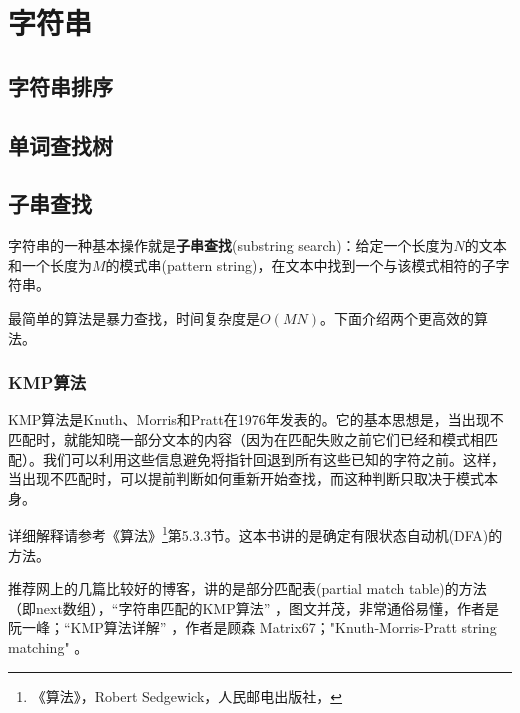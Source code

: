 \chapter{字符串}


\section{字符串排序} %


\section{单词查找树} %


\section{子串查找} %
字符串的一种基本操作就是\textbf{子串查找}(substring search)：给定一个长度为$N$的文本和一个长度为$M$的模式串(pattern string)，在文本中找到一个与该模式相符的子字符串。

最简单的算法是暴力查找，时间复杂度是$O(MN)$。下面介绍两个更高效的算法。


\subsection{KMP算法}
KMP算法是Knuth、Morris和Pratt在1976年发表的。它的基本思想是，当出现不匹配时，就能知晓一部分文本的内容（因为在匹配失败之前它们已经和模式相匹配）。我们可以利用这些信息避免将指针回退到所有这些已知的字符之前。这样，当出现不匹配时，可以提前判断如何重新开始查找，而这种判断只取决于模式本身。

详细解释请参考《算法》\footnote{《算法》，Robert Sedgewick，人民邮电出版社，}第5.3.3节。这本书讲的是确定有限状态自动机(DFA)的方法。

推荐网上的几篇比较好的博客，讲的是部分匹配表(partial match table)的方法（即next数组），“字符串匹配的KMP算法” ，图文并茂，非常通俗易懂，作者是阮一峰；“KMP算法详解” ，作者是顾森 Matrix67；"Knuth-Morris-Pratt string matching" 。

